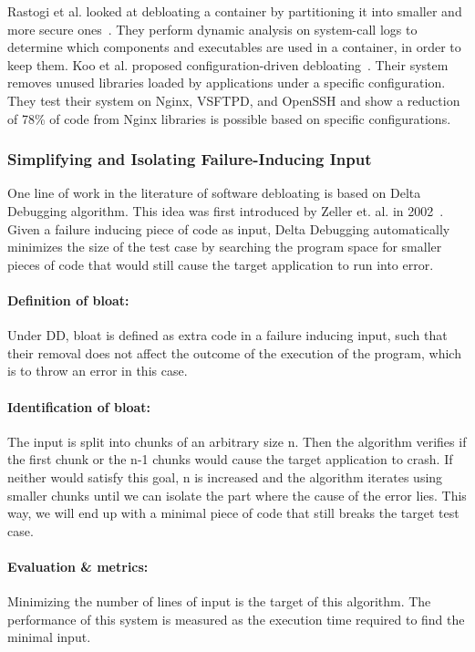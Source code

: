 Rastogi et al. looked at debloating a container by partitioning it into smaller and more secure ones~\cite{rastogi2017Cimplifier}. They perform dynamic analysis on system-call logs to determine which components and executables are used in a container, in order to keep them. Koo et al. proposed configuration-driven debloating~\cite{Koo:2019:CSD:3301417.3312501}. Their system removes unused libraries loaded by applications under a specific configuration. They test their system on Nginx, VSFTPD, and OpenSSH and show a reduction of 78\% of code from Nginx libraries is possible based on specific configurations.

\subsubsection{Simplifying and Isolating Failure-Inducing Input}
One line of work in the literature of software debloating is based on Delta Debugging algorithm. This idea was first introduced by Zeller et. al. in 2002~\cite{zeller2002Delta}.
Given a failure inducing piece of code as input, Delta Debugging automatically minimizes the size of the test case by searching the program space for smaller pieces of code that would still cause the target application to run into error.

\paragraph{Definition of bloat:} Under DD, bloat is defined as extra code in a failure inducing input, such that their removal does not affect the outcome of the execution of the program, which is to throw an error in this case.
\paragraph{Identification of bloat:} The input is split into chunks of an arbitrary size n. Then the algorithm verifies if the first chunk or the n-1 chunks would cause the target application to crash. If neither would satisfy this goal, n is increased and the algorithm iterates using smaller chunks until we can isolate the part where the cause of the error lies. This way, we will end up with a minimal piece of code that still breaks the target test case.
\paragraph{Evaluation \& metrics:} Minimizing the number of lines of input is the target of this algorithm. The performance of this system is measured as the execution time required to find the minimal input.

